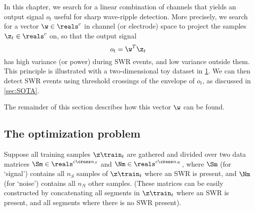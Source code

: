 \label{sec:LSM}

In this chapter, we search for a linear combination of channels that yields an output signal $o_t$ useful for sharp wave-ripple detection. More precisely, we search for a vector $\w \in \reals^c$ in channel (or electrode) space to project the samples $\z_t \in \reals^c$ on, so that the output signal
%
\begin{equation}
\label{eq:linear}
o_t = \w^T \z_t
\end{equation}
%
has high variance (or power) during SWR events, and low variance outside them. This principle is illustrated with a two-dimensional toy dataset in \cref{fig:GEVec_principle}. We can then detect SWR events using threshold crossings of the envelope of $o_t$, as discussed in \cref{sec:SOTA}.

\begin{figure}
\label{fig:GEVec_principle}
\end{figure}

The remainder of this section describes how this vector $\w$ can be found.



\subsection{The optimization problem}

Suppose all training samples $\z\train_t$ are gathered and divided over two data matrices $\Sm \in \reals^{c \cross n_S}$ and $\Nm \in \reals^{c \cross n_N}$, where $\Sm$ (for `signal') contains all $n_S$ samples of $\z\train_t$ where an SWR is present, and $\Nm$ (for `noise') contains all $n_N$ other samples. (These matrices can be easily constructed by concatenating all segments in $\z\train_t$ where an SWR is present, and all segments where there is no SWR present).

